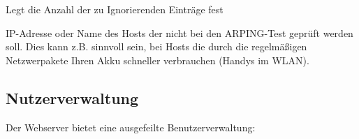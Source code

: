 \begin{description}
  {Legt die Anzahl der zu Ignorierenden Einträge fest}
  
  { IP-Adresse oder Name des Hosts der nicht bei den ARPING-Test geprüft werden soll.
  Dies kann z.B. sinnvoll sein, bei Hosts die durch die regelmäßigen Netzwerpakete 
  Ihren Akku schneller verbrauchen (Handys im WLAN).}
  
\end{description}

\subsection{Nutzerverwaltung }
  Der Webserver bietet eine ausgefeilte Benutzerverwaltung:
